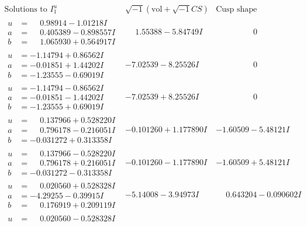 \documentclass[1p]{elsarticle_modified}
\theoremstyle{definition}
\newcommand{\I}{\sqrt{-1}}
\begin{document}
$$\begin{array}{c|c|c}
\text{Solutions to }I^u_{1}& \I (\text{vol} + \sqrt{-1}CS) & \text{Cusp shape}\\
 \hline 
\begin{aligned}
u &= \phantom{-}0.98914 - 1.01218 I \\
a &= \phantom{-}0.405389 - 0.898557 I \\
b &= \phantom{-}1.065930 + 0.564917 I\end{aligned}
 & \phantom{-}1.55388 - 5.84749 I & \phantom{-0.000000 } 0 \\ \hline\begin{aligned}
u &= -1.14794 + 0.86562 I \\
a &= -0.01851 + 1.44202 I \\
b &= -1.23555 - 0.69019 I\end{aligned}
 & -7.02539 - 8.25526 I & \phantom{-0.000000 } 0 \\ \hline\begin{aligned}
u &= -1.14794 - 0.86562 I \\
a &= -0.01851 - 1.44202 I \\
b &= -1.23555 + 0.69019 I\end{aligned}
 & -7.02539 + 8.25526 I & \phantom{-0.000000 } 0 \\ \hline\begin{aligned}
u &= \phantom{-}0.137966 + 0.528220 I \\
a &= \phantom{-}0.796178 - 0.216051 I \\
b &= -0.031272 + 0.313358 I\end{aligned}
 & -0.101260 + 1.177890 I & -1.60509 - 5.48121 I \\ \hline\begin{aligned}
u &= \phantom{-}0.137966 - 0.528220 I \\
a &= \phantom{-}0.796178 + 0.216051 I \\
b &= -0.031272 - 0.313358 I\end{aligned}
 & -0.101260 - 1.177890 I & -1.60509 + 5.48121 I \\ \hline\begin{aligned}
u &= \phantom{-}0.020560 + 0.528328 I \\
a &= -4.29255 - 0.39915 I \\
b &= \phantom{-}0.176919 + 0.209119 I\end{aligned}
 & -5.14008 - 3.94973 I & \phantom{-}0.643204 - 0.090602 I \\ \hline\begin{aligned}
u &= \phantom{-}0.020560 - 0.528328 I \\

\end{aligned}
\end{array}$$
\end{document}
